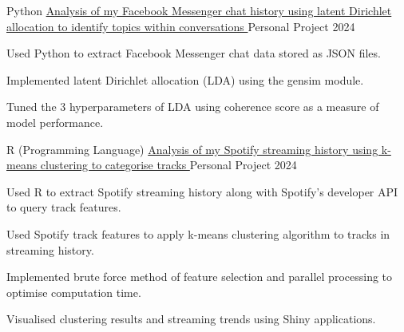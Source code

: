 

\begin{cventries}

  \cventry
    {Python}
    {\href{https://github.com/Harry2687/Messenger-Analysis}{Analysis of my Facebook Messenger chat history using latent Dirichlet allocation to identify topics within conversations \ExternalLink}}
    {Personal Project}
    {2024}
    {
      \begin{cvitems}
        \item {Used Python to extract Facebook Messenger chat data stored as JSON files.}
        \item {Implemented latent Dirichlet allocation (LDA) using the gensim module.}
        \item {Tuned the 3 hyperparameters of LDA using coherence score as a measure of model performance.}
      \end{cvitems}
    }

  \cventry
    {R (Programming Language)} %
    {\href{https://harryz.netlify.app/projects/spotify-analysis/}{Analysis of my Spotify streaming history using k-means clustering to categorise tracks \ExternalLink}} %
    {Personal Project} %
    {2024} %
    {
      \begin{cvitems} %
        \item {Used R to extract Spotify streaming history along with Spotify's developer API to query track features.}
        \item {Used Spotify track features to apply k-means clustering algorithm to tracks in streaming history.}
        \item {Implemented brute force method of feature selection and parallel processing to optimise computation time.}
        \item {Visualised clustering results and streaming trends using Shiny applications.}
      \end{cvitems}
    }


\end{cventries}
